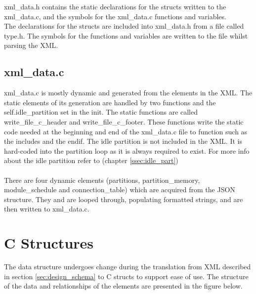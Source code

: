xml\_data.h contains the static declarations for the structs written to the xml\_data.c, and the symbols for the xml\_data.c functions and variables. 
\\
The declarations for the structs are included into xml\_data.h from a file called type.h. The symbols for the functions and variables are written to the file whilst parsing the XML.

\subsection{xml\_data.c}

xml\_data.c is mostly dynamic and generated from the elements in the XML. 
The static elements of its generation are handled by two functions and the self.idle\_partition set in the init. The static functions are called write\_file\_c\_header and write\_file\_c\_footer. These functions write the static code needed at the beginning and end of the xml\_data.c file to function such as the includes and the endif.
The idle partition is not included in the XML. It is hard-coded into the partition loop as it is always required to exist. For more info about the idle partition refer to (chapter \ref{ssec:idle_part}) 
\\\\
There are four dynamic elements (partitions, partition\_memory, module\_schedule and connection\_table) which are acquired from the JSON structure. They and are looped through, populating formatted strings, and are then written to xml\_data.c.

\section{C Structures}

The data structure undergoes change during the translation from XML described in
section \ref{sec:design_schema} to C structs to support ease of use. The
structure of the data and relationships of the elements are presented in the
figure below.

